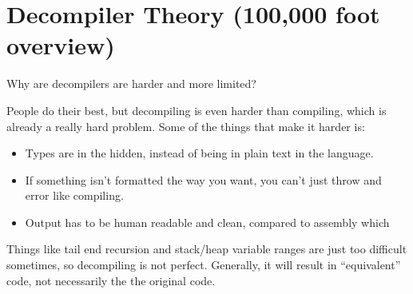 \documentclass{beamer}
\begin{document}
\section{Decompiler Theory (100,000 foot overview)}

\begin{frame}{Why are decompilers are harder and more limited?}

  People do their best, but decompiling is even harder than
  compiling, which is already a really hard problem. Some of the
  things that make it harder is:
  
  \begin{itemize}
    \item Types are in the hidden, instead of being in plain text in
      the language.
    \item If something isn't formatted the way you want, you can't
      just throw and error like compiling.
    \item Output has to be human readable and clean, compared to
      assembly which
  \end{itemize}

  Things like tail end recursion and stack/heap variable ranges are
  just too difficult sometimes, so decompiling is not
  perfect. Generally, it will result in ``equivalent'' code, not
  necessarily the the original code.
\end{frame}
\end{document}
